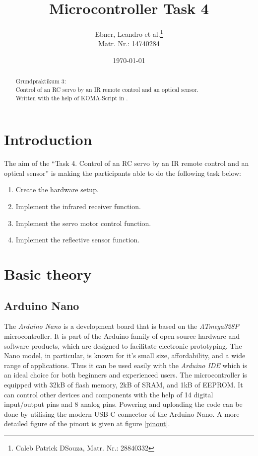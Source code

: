 \documentclass{scrartcl}                    %
\begin{document}
\title{Microcontroller Task 4}
\author{Ebner, Leandro et al.\thanks{Caleb Patrick DSouza, Matr. Nr.: 28840332} \\ Matr. Nr.: 14740284}
\date{\today}
\maketitle

\begin{abstract}
Grundpraktikum 3: \\ Control of an RC servo by an IR remote control and an optical sensor. \\
Written with the help of KOMA-Script in \LaTeXe{}.
\end{abstract}

\tableofcontents
\newpage

\section{Introduction}

The aim of the “Task 4. Control of an RC servo by an IR remote control and an optical sensor” is making the participants able to do the following task below:
\begin{enumerate}
    \item Create the hardware setup.
    \item Implement the infrared receiver function.
    \item Implement the servo motor control function.
    \item Implement the reflective sensor function.
\end{enumerate}

\section{Basic theory}
    \subsection{Arduino Nano}

    The \emph{Arduino Nano} is a development board that is based on the \emph{ATmega328P} microcontroller. It is part of the Arduino family \cite{arduino} of open source hardware and software products, which are designed to facilitate electronic prototyping. The Nano model, in particular, is known for it's small size, affordability, and a wide range of applications. Thus it can be used easily with the \emph{Arduino IDE} which is an ideal choice for both beginners and experienced users. The microcontroller is equipped with 32kB of flash memory, 2kB of SRAM, and 1kB of EEPROM. It can control other devices and components with the help of 14 digital input/output pins and 8 analog pins. Powering and uploading the code can be done by utilising the modern USB-C connector of the Arduino Nano. A more detailed figure of the pinout is given at figure \ref{pinout}.
\end{document}
